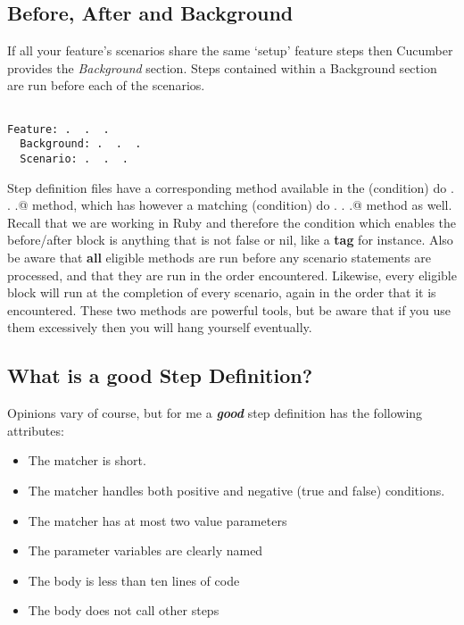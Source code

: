 \subsection{Before, After and Background}

If all your feature's scenarios share the same `setup' feature steps then Cucumber provides the \emph{Background} section.  Steps contained within a Background section are run before each of the scenarios.

\begin{verbatim}

Feature: .  .  .
  Background: .  .  .
  Scenario: .  .  .

\end{verbatim}

Step definition files have a corresponding method available in the \verb@before(condition) do .  .  .@ method, which has however a matching \verb@after(condition) do .  .  .@ method as well.  Recall that we are working in Ruby and therefore the condition which enables the before/after block is anything that is not false or nil, like a \textbf{tag} for instance.  Also be aware that \textbf{all} eligible \verb@before@ methods are run before any scenario statements are processed, and that they are run in the order encountered.  Likewise, every eligible \verb@after@ block will run at the completion of every scenario, again in the order that it is encountered.  These two methods are powerful tools, but be aware that if you use them excessively then you will hang yourself eventually.

\subsection{What is a good Step Definition?}

Opinions vary of course, but for me a \textbf{\emph{good}} step definition has the following attributes:

\begin{itemize}
  \item The matcher is short.
  \item The matcher handles both positive and negative (true and false) conditions.
  \item The matcher has at most two value parameters
  \item The parameter variables are clearly named
  \item The body is less than ten lines of code
  \item The body does not call other steps
\end{itemize}

